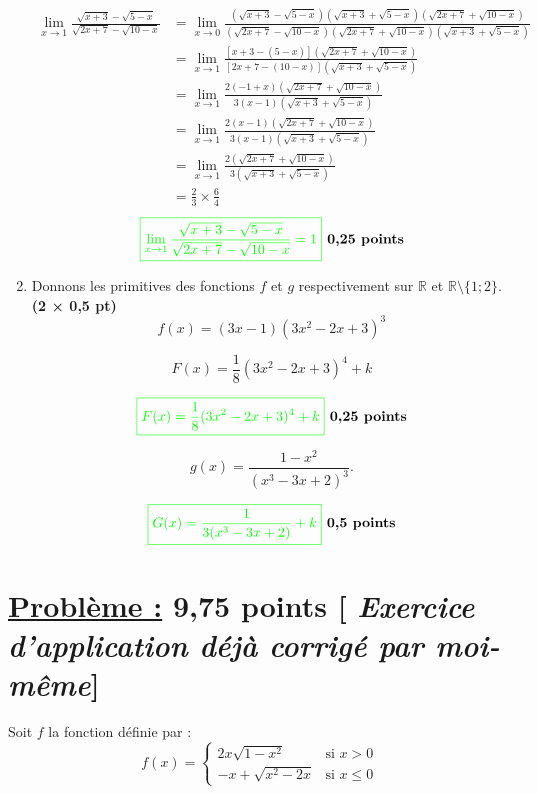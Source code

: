 \documentclass[12pt,a4paper]{article}
\begin{document}
\begin{enumerate}
    \begin{align*}
    \lim_{x \to 1} \frac{\sqrt{x + 3} - \sqrt{5 - x}}{\sqrt{2x + 7} - \sqrt{10 - x}}&=\lim_{x \to 0}\frac{\left( \sqrt{x + 3} - \sqrt{5 - x}\right)\left( \sqrt{x + 3} + \sqrt{5 - x}\right)\left( \sqrt{2x + 7} + \sqrt{10 - x}\right) }{\left( \sqrt{2x + 7} - \sqrt{10 - x}\right) \left( \sqrt{2x + 7} + \sqrt{10 - x}\right) \left( \sqrt{x + 3} + \sqrt{5 - x}\right)}\\
    &=\lim_{x \to 1} \frac{\left[ x + 3 - (5 - x)\right]\left( \sqrt{2x + 7} + \sqrt{10 - x}\right) }{ \left[  2x + 7 - (10 - x) \right]  \left( \sqrt{x + 3} + \sqrt{5 - x}\right)}\\
    &=\lim_{x \to 1} \frac{2(-1+x)\left( \sqrt{2x + 7} + \sqrt{10 - x}\right) }{ 3( x - 1 )  \left( \sqrt{x + 3} + \sqrt{5 - x}\right)}\\
    &=\lim_{x \to 1} \frac{2(x-1)\left( \sqrt{2x + 7} + \sqrt{10 - x}\right) }{ 3( x - 1 )  \left( \sqrt{x + 3} + \sqrt{5 - x}\right)}\\
    &=\lim_{x \to 1} \frac{2\left( \sqrt{2x + 7} + \sqrt{10 - x}\right) }{ 3\left( \sqrt{x + 3} + \sqrt{5 - x}\right)}\\
    &=\frac{2}{3} \times \frac{6}{4}
    \end{align*}
\[
\textcolor{green}{\boxed{ \lim_{x \to 1} \frac{\sqrt{x + 3} - \sqrt{5 - x}}{\sqrt{2x + 7} - \sqrt{10 - x}}=1 }} \textbf{ 0,25 points}
\]
    \item Donnons les primitives des fonctions \(f\) et \(g\) respectivement sur \(\mathbb{R}\) et \(\mathbb{R} \setminus \{1; 2\}\). \textbf{(2 × 0,5 pt)}
    \[
    f(x) = (3x-1)(3x^2-2x+3)^3 
    \]

		\[
    F(x) =\frac{1}{8}(3x^2-2x+3)^4+k
    \] 
       
    \[
     \textcolor{green}{\boxed{ F(x) =\frac{1}{8}(3x^2-2x+3)^4 + k }} \textbf{ 0,25 points}
    \]
    
    \[
    g(x) = \frac{1-x^2}{(x^3-3x+2)^3}.
    \]
    
    \[
     \textcolor{green}{\boxed{ G(x) = \frac{1}{3(x^3-3x+2)} + k }} \textbf{ 0,5 points}
    \]
\end{enumerate}
\section*{\underline{Problème :} 9,75 points [\textit{ Exercice d'application déjà corrigé par moi-même}]} 

Soit $f$ la fonction définie par :
\[
f(x) =
\begin{cases} 
2x\sqrt{1 - x^2} & \text{si } x > 0 \\ 
-x + \sqrt{x^2 - 2x} & \text{si } x \leq 0 
\end{cases}
\]
\end{document}
